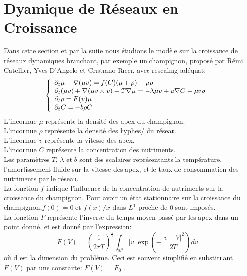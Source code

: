 \section{Dyamique de Réseaux en Croissance}
Dans cette section et par la suite nous étudions le modèle sur la croissance de réseaux dynamiques branchant, par exemple un champignon, proposé par Rémi Catellier, Yves D'Angelo et Cristiano Ricci, avec rescaling adéquat:
\begin{equation}\label{eq:BDNG}  \left\{
                \begin{array}{ll}
                \partial_t\mu + \nabla(\mu v) = f(C)(\mu + \rho) -\mu\rho \\
                   \partial_t(\mu v)+\nabla(\mu v\times v) +T\nabla\mu=-\lambda\mu v+\mu\nabla C-\mu v \rho \\
                 \partial_t\rho=  F(v) \mu \\
                  \partial_t C = -b\rho C
                \end{array}
              \right.
\end{equation} 
L'inconnue $\mu$ représente la densité des apex du champignon.\\
L'inconnue $\rho$ représente la densité des hyphes/ du réseau.\\
L'inconnue $v$ représente la vitesse des apex.\\
L'inconnue $C$ représente la concentration des nutriments.\\
Les paramètres $T$, $\lambda$ et $b$ sont des scalaires représentants la température, l'amortissement fluide sur la vitesse des apex, et le taux de consommation des nutriments par le réseau.\\
La fonction $f$ indique l'influence de la concentration de nutriments sur la croissance du champignon. Pour avoir un état stationnaire sur la croissance du champignon,$f(0)=0$ et $f(x)/x$ dans $L^1$ proche de 0 sont imposés.\\
La fonction $F$ représente l'inverse du temps moyen passé par les apex dans un point donné, et est donné par l'expression:
\begin{equation}
	F(V)=(\frac{1}{2\pi T})^\frac{d}{2}\int_{\mathbb{R}^d} |v|\exp(-\frac{|v-V|^2}{2T})dv\end{equation}
où d est la dimension du problème. Ceci est souvent simplifié en substituant $F(V)$ par une constante: $F(V)= F_0$ .\\

